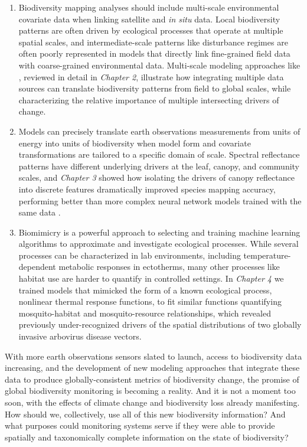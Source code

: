 \begin{enumerate}
    \item Biodiversity mapping analyses should include multi-scale environmental covariate data when linking satellite and \textit{in situ} data. Local biodiversity patterns are often driven by ecological processes that operate at multiple spatial scales, and intermediate-scale patterns like disturbance regimes are often poorly represented in models that directly link fine-grained field data with coarse-grained environmental data. Multi-scale modeling approaches like \cite{Baccini2017-zk}, reviewed in detail in \textit{Chapter 2}, illustrate how integrating multiple data sources can translate biodiversity patterns from field to global scales, while characterizing the relative importance of multiple intersecting drivers of change.
    \item Models can precisely translate earth observations measurements from units of energy into units of biodiversity when model form and covariate transformations are tailored to a specific domain of scale. Spectral reflectance patterns have different underlying drivers at the leaf, canopy, and community scales, and \textit{Chapter 3} showed how isolating the drivers of canopy reflectance into discrete features dramatically improved species mapping accuracy, performing better than more complex neural network models trained with the same data \cite{Marconi2018-wn}.
    \item Biomimicry is a powerful approach to selecting and training machine learning algorithms to approximate and investigate ecological processes. While several processes can be characterized in lab environments, including temperature-dependent metabolic responses in ectotherms, many other processes like habitat use are harder to quantify in controlled settings. In \textit{Chapter 4} we trained models that mimicked the form of a known ecological process, nonlinear thermal response functions, to fit similar functions quantifying mosquito-habitat and mosquito-resource relationships, which revealed previously under-recognized drivers of the spatial distributions of two globally invasive arbovirus disease vectors.
\end{enumerate}

\noindent With more earth observations sensors slated to launch, access to biodiversity data increasing, and the development of new modeling approaches that integrate these data to produce globally-consistent metrics of biodiversity change, the promise of global biodiversity monitoring is becoming a reality. And it is not a moment too soon, with the effects of climate change and biodiversity loss already manifesting. How should we, collectively, use all of this new biodiversity information? And what purposes could monitoring systems serve if they were able to provide spatially and taxonomically complete information on the state of biodiversity?

